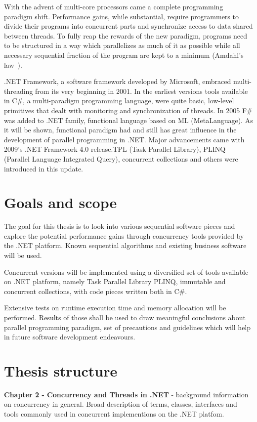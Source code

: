 With the advent of multi-core processors came a complete programming paradigm shift. Performance gains, while substantial, require programmers to divide their programs into concurrent parts and synchronize access to data shared between threads. To fully reap the rewards of the new paradigm, programs need to be structured in a way which parallelizes as much of it as possible while all necessary sequential fraction of the program are kept to a minimum (Amdahl's law~\cite{Amdahl1967}).

.NET Framework, a software framework developed by Microsoft, embraced multi-threading from its very beginning in 2001.
In the earliest versions tools available in C\#, a multi-paradigm programming language, were quite basic, low-level primitives that dealt with monitoring and synchronization of threads. In 2005 F\# was added to .NET family, functional language based on ML (MetaLanguage). As it will be shown, functional paradigm had and still has great influence in the development of parallel programming in .NET. Major advancements came with 2009's .NET Framework 4.0 release.TPL (Task Parallel Library), PLINQ (Parallel Language Integrated Query), concurrent collections and others were introduced in this update.


\section{Goals and scope}

The goal for this thesis is to look into various sequential software pieces
and explore the potential performance gains through concurrency tools 
provided by the .NET platform. Known sequential algorithms and existing business software will be used.

Concurrent versions will be implemented using a diversified set of tools available on .NET platform, namely
Task Parallel Library PLINQ, immutable and concurrent collections, with code pieces written both
in C\#.

Extensive tests on runtime execution time and memory allocation will be performed. 
Results of those shall be used to draw meaningful conclusions about parallel programming paradigm, set of precautions
and guidelines which will help in future software development endeavours. 

\section{Thesis structure}
\textbf{Chapter 2 - Concurrency and Threads in .NET} -  background information on concurrency in general. 
Broad description of terms, classes, interfaces and tools commonly used in concurrent implementions on the .NET platfom.


